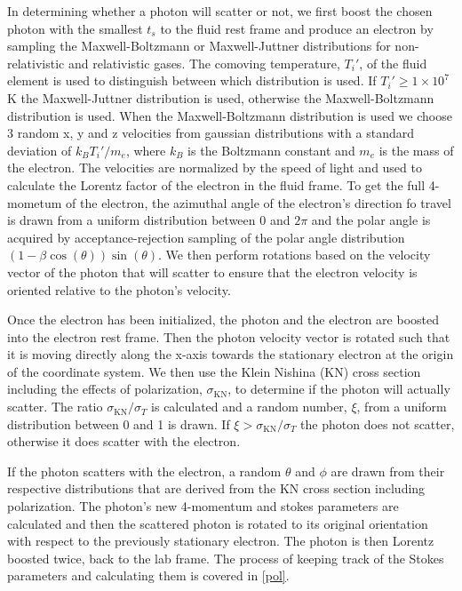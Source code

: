 \documentclass[12pt,a4paper]{article}
\begin{document}
In determining whether a photon will scatter or not, we first boost the chosen photon with the smallest $t_s$ to the fluid rest frame and produce an electron by sampling the Maxwell-Boltzmann or Maxwell-Juttner distributions for non-relativistic and relativistic gases. The comoving temperature, $T_i'$, of the fluid element is used to distinguish between which distribution is used. If $T_i' \ge 1 \times 10^7$ K the Maxwell-Juttner distribution is used, otherwise the Maxwell-Boltzmann distribution is used. When the Maxwell-Boltzmann distribution is used we choose 3 random x, y and z velocities from gaussian distributions with a standard deviation of $k_BT_i'/m_e$, where $k_B$ is the Boltzmann constant and $m_e$ is the mass of the electron. The velocities are normalized by the speed of light and used to calculate the Lorentz factor of the electron in the fluid frame. To get the full 4-mometum of the electron, the azimuthal angle of the electron's direction fo travel is drawn from a uniform distribution between 0 and $2\pi$ and the polar angle is acquired by acceptance-rejection sampling of the polar angle distribution $(1-\beta\cos(\theta))\sin(\theta) $. We then perform rotations based on the velocity vector of the photon that will scatter to ensure that the electron velocity is oriented relative to the photon's velocity.

Once the electron has been initialized, the photon and the electron are boosted into the electron rest frame. Then the photon velocity vector is rotated such that it is moving directly along the x-axis towards the stationary electron at the origin of the coordinate system. We then use the Klein Nishina (KN) cross section including the effects of polarization, $\sigma_\mathrm{KN}$, to determine if the photon will actually scatter. The ratio $\sigma_\mathrm{KN}/\sigma_T$ is calculated and a random number, $\xi$, from a uniform distribution between 0 and 1 is drawn. If $\xi >\sigma_\mathrm{KN}/\sigma_T $ the photon does not scatter, otherwise it does scatter with the electron. 

If the photon scatters with the electron, a random $\theta$ and $\phi$ are drawn from their respective distributions that are derived from the KN cross section including polarization. The photon's new 4-momentum and stokes parameters are calculated and then the scattered photon is rotated to its original orientation with respect to the previously stationary electron. The photon is then Lorentz boosted twice, back to the lab frame. The process of keeping track of the Stokes parameters and calculating them is covered in \autoref{pol}.
\end{document}
